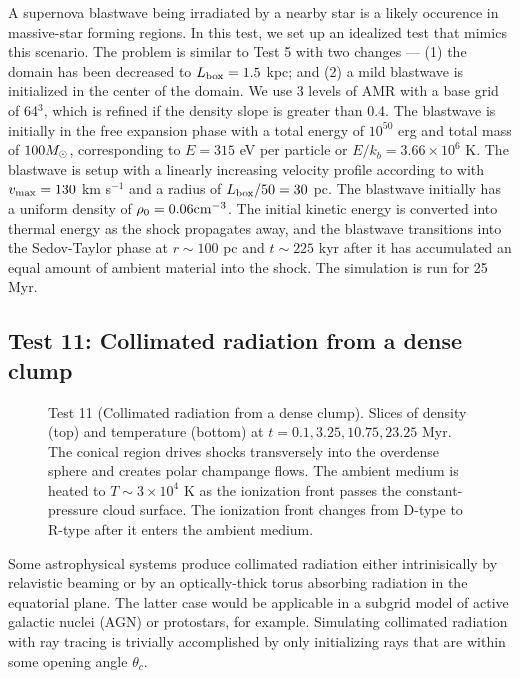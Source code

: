 \documentclass[12pt,preprint]{aastex}
\begin{document}
A supernova blastwave being irradiated by a nearby star is a likely
occurence in massive-star forming regions.  In this test, we set up an
idealized test that mimics this scenario.  The problem is similar to
Test 5 with two changes --- (1) the domain has been decreased to
$L_{\rm box} = 1.5$ kpc; and (2) a mild blastwave is initialized in
the center of the domain.  We use 3 levels of AMR with a base grid of
64$^3$, which is refined if the density slope is greater than 0.4.
The blastwave is initially in the free expansion phase with a total
energy of $10^{50}$ erg and total mass of $100 \Ms$, corresponding to
$E = 315$ eV per particle or $E/k_b = 3.66 \times 10^6$ K.  The
blastwave is setup with a linearly increasing velocity profile
according to \citet{Truelove99} with $v_{\rm max} = 130$ km s$^{-1}$
and a radius of $L_{\rm box}/50 = 30$ pc.  The blastwave initially has
a uniform density of $\rho_0 = 0.06 \cubecm$.  The initial kinetic
energy is converted into thermal energy as the shock propagates away,
and the blastwave transitions into the Sedov-Taylor phase at $r \sim
100$ pc and $t \sim 225$ kyr after it has accumulated an equal amount
of ambient material into the shock.  The simulation is run for 25 Myr.

\subsection{Test 11: Collimated radiation from a dense clump}

\begin{figure}[t]
  \caption{\label{fig:test11} Test 11 (Collimated radiation from a
    dense clump).  Slices of density (top) and temperature (bottom) at
    $t = 0.1, 3.25, 10.75, 23.25$ Myr.  The conical  region
    drives shocks transversely into the overdense sphere and creates
    polar champange flows.  The ambient medium is heated to $T \sim 3
    \times 10^4$ K as the ionization front passes the
    constant-pressure cloud surface.  The ionization front changes
    from D-type to R-type after it enters the ambient medium.}
\end{figure}

Some astrophysical systems produce collimated radiation either
intrinisically by relavistic beaming or by an optically-thick torus
absorbing radiation in the equatorial plane.  The latter case would be
applicable in a subgrid model of active galactic nuclei (AGN) or
protostars, for example.  Simulating collimated radiation with ray
tracing is trivially accomplished by only initializing rays that are
within some opening angle $\theta_c$.
\end{document}
